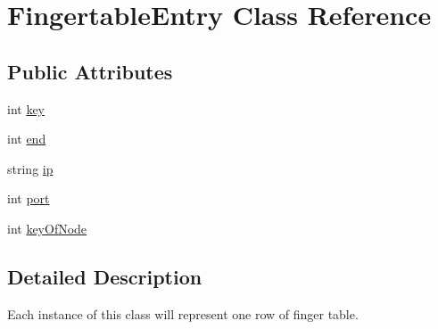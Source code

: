 \hypertarget{class_fingertable_entry}{\section{Fingertable\+Entry Class Reference}
\label{class_fingertable_entry}
}
\subsection*{Public Attributes}
\begin{DoxyCompactItemize}
\item 
int \hyperlink{class_fingertable_entry_aca47f1508456ffa9c0f2db89f75b4e69}{key}
\item 
int \hyperlink{class_fingertable_entry_adc6c7d257b25b5da177b8520ab0c4421}{end}
\item 
string \hyperlink{class_fingertable_entry_aba9999324fb31f0b28dfae67e42141f3}{ip}
\item 
int \hyperlink{class_fingertable_entry_a9c24b7b360327b88b71e6cd44d662e55}{port}
\item 
int \hyperlink{class_fingertable_entry_a75aa0df50a020917beac27ead68738d1}{key\+Of\+Node}
\end{DoxyCompactItemize}


\subsection{Detailed Description}
Each instance of this class will represent one row of finger table. 

